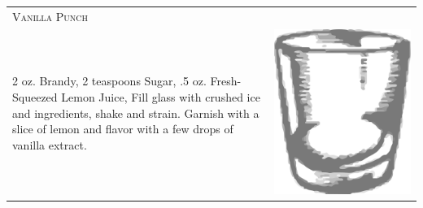 \documentclass{article}
\begin{document}
\begin{multicols}{2}
\begin{tabular}{p{2in} p{0.5in}}
\multicolumn{2}{p{3in}}{\centering\Huge\textsc{Vanilla Punch}} \\ 
  \vspace{-0.1in}2 oz. Brandy, 2 teaspoons Sugar, .5 oz. Fresh-Squeezed Lemon Juice, Fill glass with crushed ice and ingredients, shake and strain. Garnish with a slice of lemon and flavor with a few drops of vanilla extract. &  
  \vspace{-0.1in} \includegraphics{rocks_glass.png}
\end{tabular}
\end{multicols}
\end{document}
